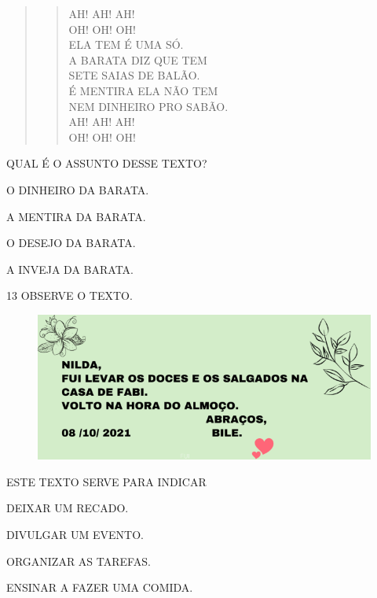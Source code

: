\begin{quote}
\begin{verse}
AH! AH! AH!\\
OH! OH! OH!\\
ELA TEM É UMA SÓ.\\
A BARATA DIZ QUE TEM\\
SETE SAIAS DE BALÃO.\\
É MENTIRA ELA NÃO TEM\\
NEM DINHEIRO PRO SABÃO.\\
AH! AH! AH!\\
OH! OH! OH!
\end{verse}

\end{quote}

QUAL É O ASSUNTO DESSE TEXTO?

\begin{escolha}
\item O DINHEIRO DA BARATA.

\item A MENTIRA DA BARATA.

\item O DESEJO DA BARATA.

\item A INVEJA DA BARATA.
\end{escolha}

\num{13} OBSERVE O TEXTO.

\begin{figure}[htpb]
\centering
\includegraphics[width=.8\textwidth]{media/image220.png}
\end{figure}

\pagebreak
ESTE TEXTO SERVE PARA INDICAR

\begin{escolha}
\item DEIXAR UM RECADO.

\item DIVULGAR UM EVENTO.

\item ORGANIZAR AS TAREFAS.

\item ENSINAR A FAZER UMA COMIDA.
\end{escolha}

